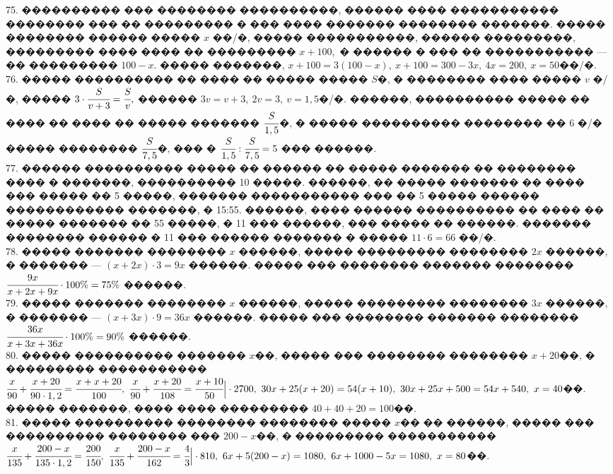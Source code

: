 \documentclass[12pt]{article}
\begin{document}
75. ���������� ��� �������� ����������, ������ ���� ����������� �������� ��� �� ��������� � ��� ���� ������� �������� �������. ����� �������� ������ ����� $x$ ��/�, ����� �����������, ������ ���������, ��������� ���� ���� �� ��������� $x+100,$ � ������ � ��� �� ����������� --- �� ��������� $100-x.$ ����� �������, $x+100=3(100-x),\ x+100=300-3x,\ 4x=200,\ x=50$��/�.\\
76. ����� ���������� �� ���� �� ����� ����� $S$�, � �������� ���� ����� $v$ �/�, ����� $3\cdot\cfrac{S}{v+3}=\cfrac{S}{v},$ ������ $3v=v+3,\ 2v=3,\ v=1,5$�/�. ������, ���������� ����� �� ���� �� ���� �� ����� ������� $\cfrac{S}{1,5}$�, � ����� ���������� �������� �� 6 �/� ����� �������� $\cfrac{S}{7,5}$�, ��� � $\cfrac{S}{1,5}:\cfrac{S}{7,5}=5$ ��� ������.\\
77. ������ ���������� ����� �� ������ �� ����� ������� �� �������� ���� � �������, ���������� 10 �����. ������, �� ����� ������� �� ���� ��� ����� �� 5 �����, ������� ����������� ��� �� 5 ����� ������ ������������ �������, � 15:55. ������, ���� ������ ���������� �� ���� �� ����� ������� �� 55 �����, � 11 ��� ������, ��� ����� �� ������. ������� �������� ������ � 11 ��� ������ ������� � ����� $11\cdot6=66$ ��/�.\\
78. ����� ������� �������� $x$ ������, ����� ��������� �������� $2x$ ������, � ������� --- $(x+2x)\cdot3=9x$ ������. ����� ��� �������� ������� �������� $\cfrac{9x}{x+2x+9x}\cdot100\%=75\%$ ������.\\
79. ����� ������� �������� $x$ ������, ����� ��������� �������� $3x$ ������, � ������� --- $(x+3x)\cdot9=36x$ ������. ����� ��� �������� ������� �������� $\cfrac{36x}{x+3x+36x}\cdot100\%=90\%$ ������.\\
80. ����� ���������� ������� $x$��, ����� ��� �������� �������� $x+20$��, � ��������� ����������� $\cfrac{x}{90}+\cfrac{x+20}{90\cdot1,2}=\cfrac{x+x+20}{100},\
\cfrac{x}{90}+\cfrac{x+20}{108}=\cfrac{x+10}{50}\Big|\cdot2700,\
30x+25(x+20)=54(x+10),\ 30x+25x+500=54x+540,\ x=40$��. ����� �������, ���� ���� ��������� $40+40+20=100$��.\\
81. ����� ���������� �������� �������� ����� $x$�� �� ������, ����� ��� ���������� �������� ��� $200-x$��, � ��������� �����������
$\cfrac{x}{135}+\cfrac{200-x}{135\cdot1,2}=\cfrac{200}{150},\
\cfrac{x}{135}+\cfrac{200-x}{162}=\cfrac{4}{3}\Big|\cdot 810,\
6x+5(200-x)=1080,\ 6x+1000-5x=1080,\ x=80$��.
\newpage
\end{document}

